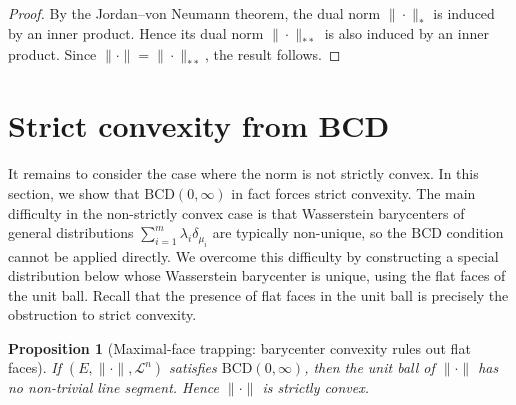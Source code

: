 \documentclass[a4paper,11pt]{article}
\numberwithin{equation}{section}
\newtheorem{proposition}[theorem]{Proposition}
\newcommand{\cL}{\mathcal L}
\begin{document}
	\begin{proof}
		By the Jordan--von Neumann theorem, the dual norm $\|\cdot\|_*$ is induced by an inner product. Hence its dual norm $\|\cdot\|_{**}$ is also induced by an inner product. Since $\|\cdot\|=\|\cdot\|_{**}$, the result follows.
	\end{proof}
	
	
	\section{Strict convexity from BCD}\label{sec:strict-convexity}
	
		It remains to consider the case where the norm is not strictly convex. In this section, we show that $\mathrm{BCD}(0,\infty)$ in fact forces strict convexity. The main difficulty in the non-strictly convex case is that Wasserstein barycenters of general distributions $\sum_{i=1}^{m}\lambda_i\delta_{\mu_i}$ are typically non-unique, so the $\mathrm{BCD}$ condition cannot be applied directly. We overcome this difficulty by constructing a special distribution below whose Wasserstein barycenter is unique, using the flat faces of the unit ball. Recall that the presence of flat faces in the unit ball is precisely the obstruction to strict convexity.
	
	\begin{proposition}[Maximal-face trapping: barycenter convexity rules out flat faces]
		\label{prop:strict-convexity}
		If $(E,\|\cdot\|,\cL^n)$ satisfies $\mathrm{BCD}(0,\infty)$, then the unit ball of $\|\cdot\|$ has no non-trivial line segment. Hence $\|\cdot\|$ is strictly convex.
	\end{proposition}
	
\end{document}
